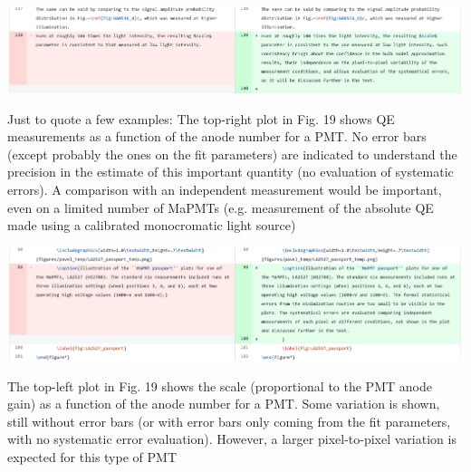 \documentclass[11pt]{report}
\begin{document}
{\begin{tcolorbox}[enlarge top by=2em,colbacktitle=green!60!white,colframe=black!80!white,width=0.9\linewidth,left=30pt,right=30pt,top=10pt,bottom=10pt,boxrule=0.3pt,title=\bfseries our draft remarks]
\end{tcolorbox}


\includegraphics[width=\linewidth]{round1/2.09.png}
}


\begin{tcolorbox}[enlarge top by=2em,colbacktitle=black!60!white,colframe=black!80!white,left=0pt,right=0pt,top=0pt,bottom=0pt,boxrule=0.3pt,title=\bfseries2.09a]
Just to quote a few examples: The top-right plot in Fig. 19 shows QE measurements as a function of the anode number for a PMT. No error bars (except probably the ones on the fit parameters) are indicated to understand the precision in the estimate of this important quantity (no evaluation of systematic errors). A comparison with an independent measurement would be important, even on a limited number of MaPMTs (e.g. measurement of the absolute QE made using a calibrated monocromatic light source)
\end{tcolorbox}

\includegraphics[width=\linewidth]{round1/2.09a.png}



\begin{tcolorbox}[enlarge top by=2em,colbacktitle=black!60!white,colframe=black!80!white,left=0pt,right=0pt,top=0pt,bottom=0pt,boxrule=0.3pt,title=\bfseries2.09b]
The top-left plot in Fig. 19 shows the scale (proportional to the PMT anode gain) as a function of the anode number for a PMT. Some variation is shown, still without error bars (or with error bars only coming from the fit parameters, with no systematic error evaluation). However, a larger pixel-to-pixel variation is expected for this type of PMT
\end{tcolorbox}
\end{document}
